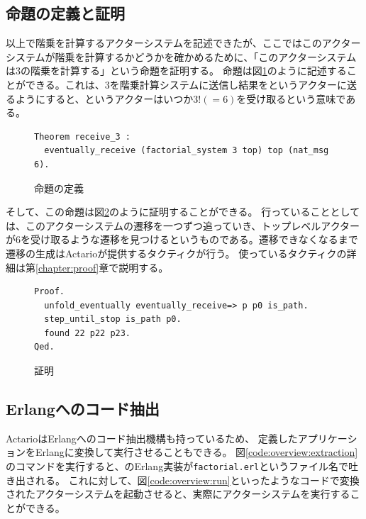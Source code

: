 \subsection{命題の定義と証明}

以上で階乗を計算するアクターシステムを記述できたが、ここではこのアクターシステムが階乗を計算するかどうかを確かめるために、「このアクターシステムは3の階乗を計算する」という命題を証明する。
命題は図\ref{code:overview:fact-spec}のように記述することができる。これは、$3$を階乗計算システムに送信し結果をというアクターに送るようにすると、というアクターはいつか$3! (= 6)$を受け取るという意味である。

\begin{figure}[tp]
\begin{lstlisting}
Theorem receive_3 :
  eventually_receive (factorial_system 3 top) top (nat_msg 6).
\end{lstlisting}
\label{code:overview:fact-spec}
\caption{命題の定義}
\end{figure}

そして、この命題は図\ref{code:overview:fact-proof}のように証明することができる。
行っていることとしては、このアクターシステムの遷移を一つずつ追っていき、トップレベルアクターが$6$を受け取るような遷移を見つけるというものである。遷移できなくなるまで遷移の生成はActarioが提供するタクティクが行う。
使っているタクティクの詳細は第\ref{chapter:proof}章で説明する。

\begin{figure}[tp]
\begin{lstlisting}
Proof.
  unfold_eventually eventually_receive=> p p0 is_path.
  step_until_stop is_path p0.
  found 22 p22 p23.
Qed.
\end{lstlisting}
  \label{code:overview:fact-proof}
  \caption{証明}
\end{figure}


\subsection{Erlangへのコード抽出}

ActarioはErlangへのコード抽出機構も持っているため、
定義したアプリケーションをErlangに変換して実行させることもできる。
図\ref{code:overview:extraction}のコマンドを実行すると、のErlang実装が\texttt{factorial.erl}というファイル名で吐き出される。
これに対して、図\ref{code:overview:run}といったようなコードで変換されたアクターシステムを起動させると、実際にアクターシステムを実行することができる。

